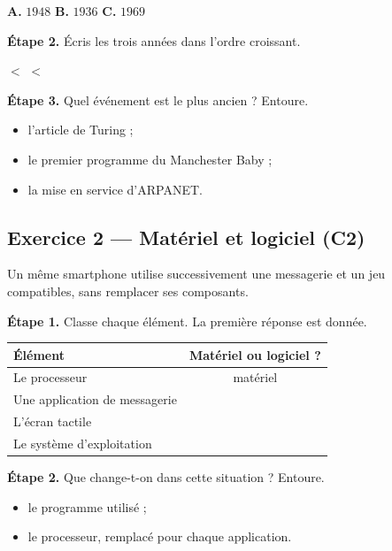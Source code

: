 \medskip
\textbf{A.} $1948$ \qquad \textbf{B.} $1936$ \qquad \textbf{C.} $1969$

\bigskip

\textbf{Étape 2.} Écris les trois années dans l'ordre croissant.

\medskip
\dotfill \quad $<$ \quad \dotfill \quad $<$ \quad \dotfill

\bigskip

\textbf{Étape 3.} Quel événement est le plus ancien ? Entoure.

\medskip
\begin{itemize}
  \item l'article de Turing ;
  \item le premier programme du Manchester Baby ;
  \item la mise en service d'ARPANET.
\end{itemize}

\bigskip

\subsection*{Exercice 2 --- Matériel et logiciel (C2)}

Un même smartphone utilise successivement une messagerie et un jeu compatibles,
sans remplacer ses composants.

\bigskip

\textbf{Étape 1.} Classe chaque élément. La première réponse est donnée.

\medskip

\begin{center}
\begin{tabular}{|l|c|}
\hline
\textbf{Élément} & \textbf{Matériel ou logiciel ?} \\
\hline
Le processeur & matériel \\
\hline
Une application de messagerie & \dotfill \\
\hline
L'écran tactile & \dotfill \\
\hline
Le système d'exploitation & \dotfill \\
\hline
\end{tabular}
\end{center}

\bigskip

\textbf{Étape 2.} Que change-t-on dans cette situation ? Entoure.

\medskip
\begin{itemize}
  \item le programme utilisé ;
  \item le processeur, remplacé pour chaque application.
\end{itemize}

